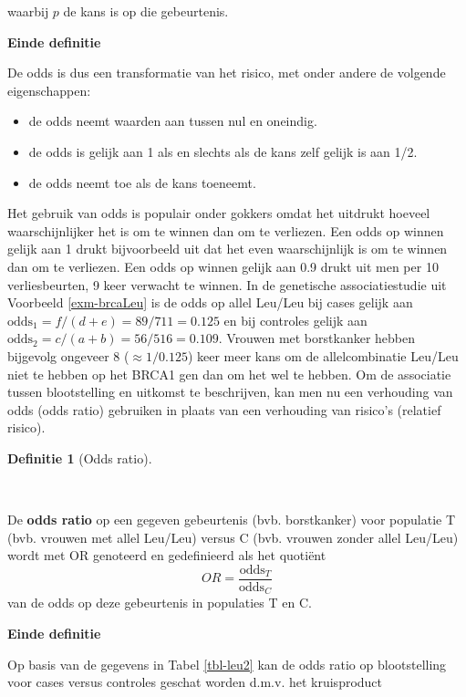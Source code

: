 \documentclass[
  dutch,
  letterpaper,
  12pt]{book}
\theoremstyle{definition}
\theoremstyle{definition}
\newtheorem{definition}{Definitie}[chapter]
\theoremstyle{definition}
\theoremstyle{remark}
\begin{document}
waarbij \(p\) de kans is op die gebeurtenis.

\textbf{Einde definitie}

De odds is dus een transformatie van het risico, met onder andere de
volgende eigenschappen:

\begin{itemize}
\item
  de odds neemt waarden aan tussen nul en oneindig.
\item
  de odds is gelijk aan 1 als en slechts als de kans zelf gelijk is aan
  1/2.
\item
  de odds neemt toe als de kans toeneemt.
\end{itemize}

Het gebruik van odds is populair onder gokkers omdat het uitdrukt
hoeveel waarschijnlijker het is om te winnen dan om te verliezen. Een
odds op winnen gelijk aan 1 drukt bijvoorbeeld uit dat het even
waarschijnlijk is om te winnen dan om te verliezen. Een odds op winnen
gelijk aan 0.9 drukt uit men per 10 verliesbeurten, 9 keer verwacht te
winnen. In de genetische associatiestudie uit Voorbeeld
\ref{exm-brcaLeu} is de odds op allel Leu/Leu bij cases gelijk aan
\(\mbox{odds}_1=f/(d+e)=89/711=0.125\) en bij controles gelijk aan
\(\mbox{odds}_2=c/(a+b)=56/516=0.109\). Vrouwen met borstkanker hebben
bijgevolg ongeveer 8 (\(\approx 1/0.125\)) keer meer kans om de
allelcombinatie Leu/Leu niet te hebben op het BRCA1 gen dan om het wel
te hebben. Om de associatie tussen blootstelling en uitkomst te
beschrijven, kan men nu een verhouding van odds (odds ratio) gebruiken
in plaats van een verhouding van risico's (relatief risico).

\begin{definition}[Odds
ratio]\protect\hypertarget{def-odds-ratio}{}\label{def-odds-ratio}

~

\end{definition}

De \textbf{odds ratio} op een gegeven gebeurtenis (bvb. borstkanker)
voor populatie T (bvb. vrouwen met allel Leu/Leu) versus C (bvb. vrouwen
zonder allel Leu/Leu) wordt met OR genoteerd en gedefinieerd als het
quotiënt \begin{equation*}
OR=\frac{\mbox{odds}_T}{\mbox{odds}_C}
\end{equation*} van de odds op deze gebeurtenis in populaties T en C.

\textbf{Einde definitie}

Op basis van de gegevens in Tabel \ref{tbl-leu2} kan de odds ratio op
blootstelling voor cases versus controles geschat worden d.m.v. het
kruisproduct
\end{document}
